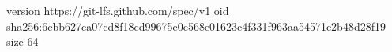 version https://git-lfs.github.com/spec/v1
oid sha256:6cbb627ca07cd8f18cd99675e0c568e01623c4f331f963aa54571c2b48d28f19
size 64
